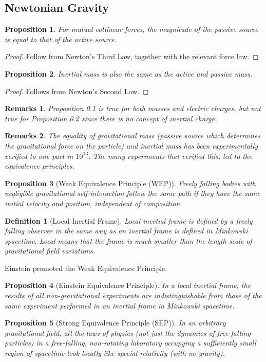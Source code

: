 \documentclass[a4paper]{article}
\newtheorem{remarks}{Remarks}[section]
\theoremstyle{new}
\newtheorem{defi}{Definition}[section]
\newtheorem{prop}{Proposition}[section]
\begin{document}
\subsection{Newtonian Gravity}
\begin{prop}
For mutual collinear forces, the magnitude of the passive source is equal to that of the active source.
\end{prop}
\begin{proof}
Follow from Newton's Third Law, together with the relevant force law.
\end{proof}
\begin{prop}
Inertial mass is also the same as the active and passive mass.
\end{prop}
\begin{proof}
Follows from Newton's Second Law. 
\end{proof}
\begin{remarks}
Proposition 0.1 is true for both masses and electric charges, but not true for Proposition 0.2 since there is no concept of inertial charge.
\end{remarks}
\begin{remarks}
The equality of gravitational mass (passive source which determines the gravitational force on the particle) and inertial mass has been experimentally verified to one part in $10^{13}$. The many experiments that verified this, led to the equivalence principles.
\end{remarks}
\begin{prop}[Weak Equivalence Principle (WEP)]
Freely falling bodies with negligible gravitational self-interaction follow the same path if they have the same initial velocity and position, independent of composition.
\end{prop}
\begin{defi}[Local Inertial Frame]
Local inertial frame is defined by a freely falling observer in the same way as an inertial frame is defined in Minkowski spacetime. Local means that the frame is much smaller than the length scale of gravitational field variations. 
\end{defi}
Einstein promoted the Weak Equivalence Principle.
\begin{prop}[Einstein Equivalence Principle]
In a local inertial frame, the results of all non-gravitational experiments are indistinguishable from those of the same experiment performed in an inertial frame in Minkowski spacetime.
\end{prop}
\begin{prop}[Strong Equivalence Principle (SEP)]
In an arbitrary gravitational field, all the laws of physics (not just the dynamics of free-falling particles) in a free-falling, non-rotating laboratory occupying a
sufficiently small region of spacetime look locally like
special relativity (with no gravity).
\end{prop}
\end{document}
